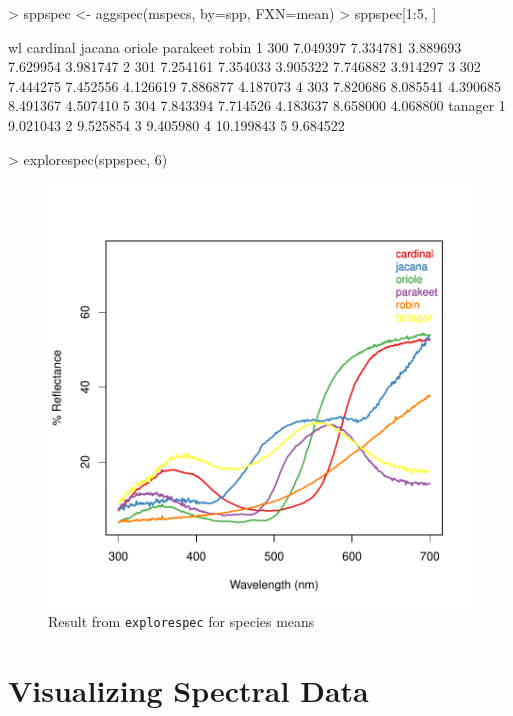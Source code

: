 \documentclass{article}
\newcommand{\code}[1]{{\tt #1}}  %
\begin{document}
\begin{Schunk}
\begin{Sinput}
> sppspec <- aggspec(mspecs, by=spp, FXN=mean)
> sppspec[1:5, ]
\end{Sinput}
\begin{Soutput}
   wl cardinal   jacana   oriole parakeet    robin
1 300 7.049397 7.334781 3.889693 7.629954 3.981747
2 301 7.254161 7.354033 3.905322 7.746882 3.914297
3 302 7.444275 7.452556 4.126619 7.886877 4.187073
4 303 7.820686 8.085541 4.390685 8.491367 4.507410
5 304 7.843394 7.714526 4.183637 8.658000 4.068800
    tanager
1  9.021043
2  9.525854
3  9.405980
4 10.199843
5  9.684522
\end{Soutput}
\begin{Sinput}
> explorespec(sppspec, 6)
\end{Sinput}
\end{Schunk}

\begin{figure}[H] %
\begin{center}
\includegraphics{pavo-exploresppmeans}
\end{center}
\caption{Result from \code{explorespec} for species means}
\label{figure:sppmeans}
\end{figure}


\section{Visualizing Spectral Data}
\end{document}
